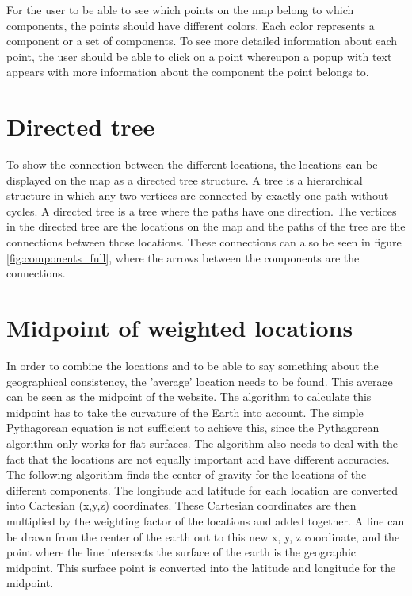 \documentclass[twoside,openright,notitlepage]{uva-bachelor-thesis}
\begin{document}
For the user to be able to see which points on the map belong to which components, the points should have different colors. Each color represents a component or a set of components. To see more detailed information about each point, the user should be able to click on a point whereupon a popup with text appears with more information about the component the point belongs to.

\section{Directed tree}
To show the connection between the different locations, the locations can be displayed on the map as a directed tree structure. A tree is a hierarchical structure in which any two vertices are connected by exactly one path without cycles. A directed tree is a tree where the paths have one direction. The vertices in the directed tree are the locations on the map and the paths of the tree are the connections between those locations. These connections can also be seen in figure \ref{fig:components_full}, where the arrows between the components are the connections.

\section{Midpoint of weighted locations}
In order to combine the locations and to be able to say something about the geographical consistency, the 'average' location needs to be found. This average can be seen as the midpoint of the website. The algorithm to calculate this midpoint has to take the curvature of the Earth into account. The simple Pythagorean equation is not sufficient to achieve this, since the Pythagorean algorithm only works for flat surfaces. The algorithm also needs to deal with the fact that the locations are not equally important and have different accuracies. \\

The following algorithm finds the center of gravity for the locations of the different components. The longitude and latitude for each location are converted into Cartesian (x,y,z) coordinates. These Cartesian coordinates are then multiplied by the weighting factor of the locations and added together. A line can be drawn from the center of the earth out to this new x, y, z coordinate, and the point where the line intersects the surface of the earth is the geographic midpoint. This surface point is converted into the latitude and longitude for the midpoint.~\cite{midpoint}\\ 
\end{document}
